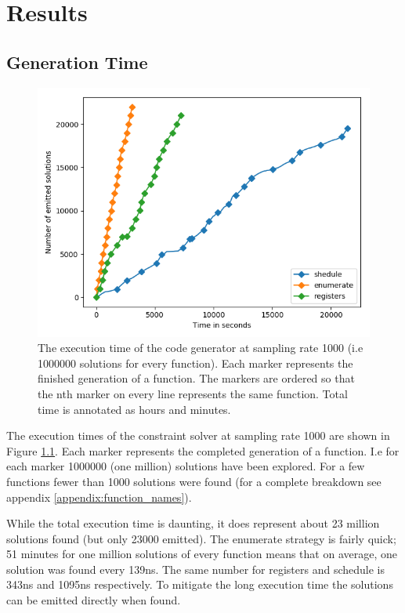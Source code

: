 \chapter{Results}

\section{Generation Time}

\begin{figure}[h]
	\centering
	\includegraphics[width=\textwidth,height=0.5\textheight]{results/figures/generator_time}
	\caption{The execution time of the code generator at sampling rate 1000 (i.e 1000000 solutions for every function). Each marker represents the finished generation of a function. The markers are ordered so that the nth marker on every line represents the same function. Total time is annotated as hours and minutes.}
	\label{fig:time}
\end{figure}

The execution times of the constraint solver at sampling rate 1000 are shown in Figure
\ref{fig:time}. Each marker represents the completed generation of a function. I.e for each
marker 1000000 (one million) solutions have been explored. For a few functions fewer than
1000 solutions were found (for a complete breakdown see appendix \ref{appendix:function_names}).

While the total execution time is daunting, it does represent about 23 million solutions
found (but only 23000 emitted). The enumerate strategy is fairly quick; 51 minutes for one
million solutions of every function means that on average, one solution was found every
139ns. The same number for registers and schedule is 343ns and 1095ns respectively. To
mitigate the long execution time the solutions can be emitted directly when found.

